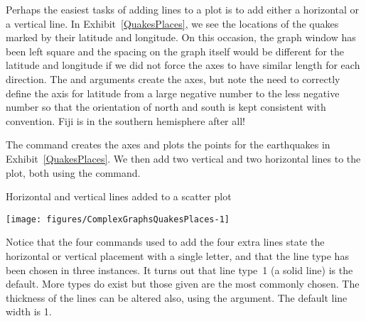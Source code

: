 Perhaps the easiest tasks of adding lines to a plot is to add either a horizontal or a vertical line. In Exhibit~\ref{QuakesPlaces}, we see the locations of the quakes marked by their latitude and longitude. On this occasion, the graph window has been left square and the spacing on the graph itself would be different for the latitude and longitude if we did not force the axes to have similar length for each direction. The  and  arguments create the axes, but note the need to correctly define the axis for latitude from a large negative number to the less negative number so that the orientation of north and south is kept consistent with convention. Fiji is in the southern hemisphere after all! 
 
The  command creates the axes and plots the points for the earthquakes in Exhibit~\ref{QuakesPlaces}. We then add two vertical and two horizontal lines to the plot, both using the  command. 
\begin{exhibit} 
\begin{center} 
\caption{Horizontal and vertical lines added to a scatter plot} 
\label{QuakesPlaces} 
\begin{knitrout}
\color{fgcolor}\begin{kframe}
\begin{alltt}
\hlstd{> }\hlopt{~}  \hlstd{=}\hlstd{(}\hlstd{,}\hlstd{),} \hlstd{=}\hlstd{(}\hlopt{-}\hlstd{,}\hlopt{-}\hlstd{))}
\hlstd{> }\hlstd{(}\hlstd{=}\hlopt{-}\hlstd{)}
\hlstd{> }\hlstd{(}\hlstd{=}\hlopt{-}\hlstd{,} \hlstd{=}\hlstd{)}
\hlstd{> }\hlstd{(}\hlstd{=}\hlstd{,} \hlstd{=}\hlstd{)}
\hlstd{> }\hlstd{(}\hlstd{=}\hlstd{,} \hlstd{=}\hlstd{)}
\end{alltt}
\end{kframe}
\texttt{[image: figures/ComplexGraphsQuakesPlaces-1]} 

\end{knitrout}
\end{center} 
\end{exhibit} 
Notice that the four commands used to add the four extra lines state the horizontal or vertical placement with a single letter, and that the line type has been chosen in three instances. It turns out that line type~1 (a solid line) is the default. More types do exist but those given are the most commonly chosen. The thickness of the lines can be altered also, using the  argument. The default line width is 1. 
 
